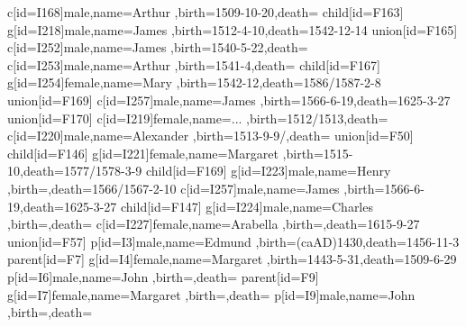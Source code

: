 {{{			c[id=I168]{male,name={Arthur },birth={1509-10-20}{},death={}{}}
			child[id=F163]{
				g[id=I218]{male,name={James },birth={1512-4-10}{},death={1542-12-14}{}}
				union[id=F165]{
					c[id=I252]{male,name={James },birth={1540-5-22}{},death={}{}}
					c[id=I253]{male,name={Arthur },birth={1541-4}{},death={}{}}
					child[id=F167]{
						g[id=I254]{female,name={Mary },birth={1542-12}{},death={1586/1587-2-8}{}}
						union[id=F169]{
							c[id=I257]{male,name={James },birth={1566-6-19}{},death={1625-3-27}{}}
						}
						union[id=F170]{
						}
					}
				}
			}
			c[id=I219]{female,name={... },birth={1512/1513}{},death={}{}}
			c[id=I220]{male,name={Alexander },birth={1513-9-9/}{},death={}{}}
			union[id=F50]{
				child[id=F146]{
					g[id=I221]{female,name={Margaret },birth={1515-10}{},death={1577/1578-3-9}{}}
					child[id=F169]{
						g[id=I223]{male,name={Henry },birth={}{},death={1566/1567-2-10}{}}
						c[id=I257]{male,name={James },birth={1566-6-19}{},death={1625-3-27}{}}
					}
					child[id=F147]{
						g[id=I224]{male,name={Charles },birth={}{},death={}{}}
						c[id=I227]{female,name={Arabella },birth={}{},death={1615-9-27}{}}
					}
				}
			}
			union[id=F57]{
			}
		}
	}
	p[id=I3]{male,name={Edmund },birth={(caAD)1430}{},death={1456-11-3}{}}
	parent[id=F7]{
		g[id=I4]{female,name={Margaret },birth={1443-5-31}{},death={1509-6-29}{}}
		p[id=I6]{male,name={John },birth={}{},death={}{}}
		parent[id=F9]{
			g[id=I7]{female,name={Margaret },birth={}{},death={}{}}
			p[id=I9]{male,name={John },birth={}{},death={}{}}
		}
	}
}
